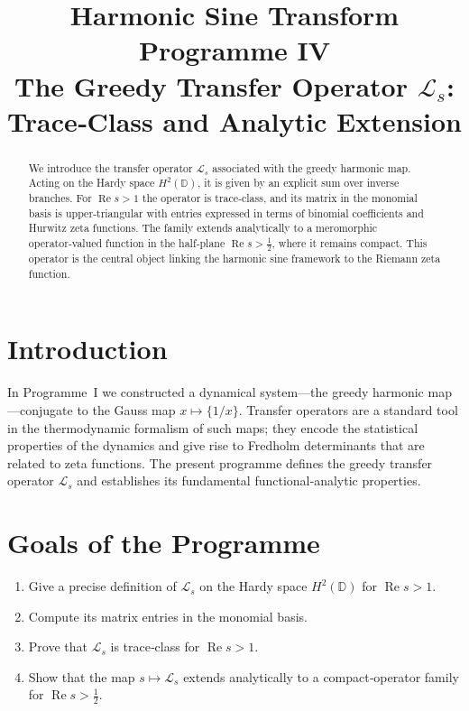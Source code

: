 \documentclass[11pt,a4paper]{article}
\title{\bfseries Harmonic Sine Transform Programme IV\\
\large The Greedy Transfer Operator \(\mathcal{L}_s\): Trace‑Class and Analytic Extension}
\author{}
\date{}
\begin{document}
\maketitle

\begin{abstract}
We introduce the transfer operator \(\mathcal{L}_s\) associated with the greedy harmonic map.  Acting on the Hardy space \(H^2(\mathbb{D})\), it is given by an explicit sum over inverse branches.  For \(\operatorname{Re}s>1\) the operator is trace‑class, and its matrix in the monomial basis is upper‑triangular with entries expressed in terms of binomial coefficients and Hurwitz zeta functions.  The family extends analytically to a meromorphic operator‑valued function in the half‑plane \(\operatorname{Re}s>\frac12\), where it remains compact.  This operator is the central object linking the harmonic sine framework to the Riemann zeta function.
\end{abstract}

\section{Introduction}
In Programme~I we constructed a dynamical system—the greedy harmonic map—conjugate to the Gauss map \(x\mapsto\{1/x\}\).  Transfer operators are a standard tool in the thermodynamic formalism of such maps; they encode the statistical properties of the dynamics and give rise to Fredholm determinants that are related to zeta functions.  The present programme defines the greedy transfer operator \(\mathcal{L}_s\) and establishes its fundamental functional‑analytic properties.

\section{Goals of the Programme}
\begin{enumerate}
\item Give a precise definition of \(\mathcal{L}_s\) on the Hardy space \(H^2(\mathbb{D})\) for \(\operatorname{Re}s>1\).
\item Compute its matrix entries in the monomial basis.
\item Prove that \(\mathcal{L}_s\) is trace‑class for \(\operatorname{Re}s>1\).
\item Show that the map \(s\mapsto\mathcal{L}_s\) extends analytically to a compact‑operator family for \(\operatorname{Re}s>\frac12\).
\end{enumerate}
\end{document}
